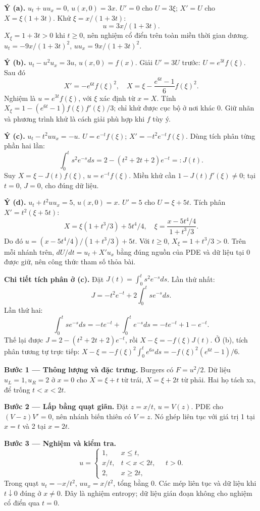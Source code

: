 \textbf{Ý (a).} $u_t+uu_x=0$, $u(x,0)=3x$. $U'=0$ cho $U=3\xi$; $X'=U$ cho $X=\xi(1+3t)$. Khử $\xi=x/(1+3t)$:
\[u=3x/(1+3t).\]
$X_\xi=1+3t>0$ khi $t\ge0$, nên nghiệm cổ điển trên toàn miền thời gian dương. $u_t=-9x/(1+3t)^2$, $uu_x=9x/(1+3t)^2$.

\textbf{Ý (b).} $u_t-u^2u_x=3u$, $u(x,0)=f(x)$. Giải $U'=3U$ trước: $U=e^{3t}f(\xi)$. Sau đó
\[X'= -e^{6t}f(\xi)^2,\quad X=\xi-\frac{e^{6t}-1}{6}f(\xi)^2.\]
Nghiệm là $u=e^{3t}f(\xi)$, với $\xi$ xác định từ $x=X$. Tính $X_\xi=1-(e^{6t}-1)f(\xi)f'(\xi)/3$; chỉ khử được cục bộ ở nơi khác 0. Giữ nhãn và phương trình khử là cách giải phù hợp khi $f$ tùy ý.

\textbf{Ý (c).} $u_t-t^2uu_x=-u$. $U=e^{-t}f(\xi)$; $X'= -t^2e^{-t}f(\xi)$. Dùng tích phân từng phần hai lần:
\[\int_0^t s^2e^{-s}ds=2-(t^2+2t+2)e^{-t}=:J(t).\]
Suy $X=\xi-J(t)f(\xi)$, $u=e^{-t}f(\xi)$. Miền khử cần $1-J(t)f'(\xi)\ne0$; tại $t=0$, $J=0$, cho đúng dữ liệu.

\textbf{Ý (d).} $u_t+t^2uu_x=5$, $u(x,0)=x$. $U'=5$ cho $U=\xi+5t$. Tích phân $X'=t^2(\xi+5t)$:
\[X=\xi(1+t^3/3)+5t^4/4,\quad \xi=\frac{x-5t^4/4}{1+t^3/3}.\]
Do đó $u=(x-5t^4/4)/(1+t^3/3)+5t$. Với $t\ge0$, $X_\xi=1+t^3/3>0$. Trên mỗi nhánh trên, $dU/dt=u_t+X'u_x$ bằng đúng nguồn của PDE và dữ liệu tại 0 được giữ, nên công thức tham số thỏa bài.

\textbf{Chi tiết tích phân ở (c).} Đặt $J(t)=\int_0^t s^2e^{-s}ds$. Lần thứ nhất:
\[J=-t^2e^{-t}+2\int_0^t se^{-s}ds.\]
Lần thứ hai:
\[\int_0^t se^{-s}ds=-te^{-t}+\int_0^t e^{-s}ds=-te^{-t}+1-e^{-t}.\]
Thế lại được $J=2-(t^2+2t+2)e^{-t}$, rồi $X-\xi=-f(\xi)J(t)$. Ở (b), tích phân tương tự trực tiếp: $X-\xi=-f(\xi)^2\int_0^te^{6s}ds=-f(\xi)^2(e^{6t}-1)/6$.

\textbf{Bước 1 — Thông lượng và đặc trưng.} Burgers có $F=u^2/2$. Dữ liệu $u_L=1,u_R=2$ ở $x=0$ cho $X=\xi+t$ từ trái, $X=\xi+2t$ từ phải. Hai họ tách xa, để trống $t<x<2t$.

\textbf{Bước 2 — Lấp bằng quạt giãn.} Đặt $z=x/t$, $u=V(z)$. PDE cho $(V-z)V'=0$, nên nhánh biến thiên có $V=z$. Nó ghép liên tục với giá trị 1 tại $x=t$ và 2 tại $x=2t$.

\textbf{Bước 3 — Nghiệm và kiểm tra.}
\[u=\begin{cases}1,&x\le t,\\x/t,&t<x<2t,\\2,&x\ge2t,\end{cases}\quad t>0.\]
Trong quạt $u_t=-x/t^2$, $uu_x=x/t^2$, tổng bằng 0. Các mép liên tục và dữ liệu khi $t\downarrow0$ đúng ở $x\ne0$. Đây là nghiệm entropy; dữ liệu gián đoạn không cho nghiệm cổ điển qua $t=0$.

